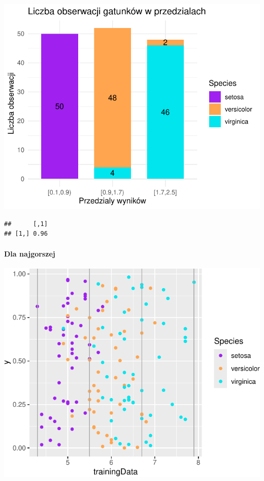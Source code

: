 \documentclass[
  12pt,
]{article}
\begin{document}
\begin{center}\includegraphics{Sprawozdanie2_files/figure-latex/tabela_kondygnacji_2_najl-1} \end{center}

\begin{verbatim}
##      [,1]
## [1,] 0.96
\end{verbatim}

\paragraph{Dla najgorszej}\label{dla-najgorszej-1}

\begin{center}\includegraphics{Sprawozdanie2_files/figure-latex/width_najg-1} \end{center}
\end{document}

